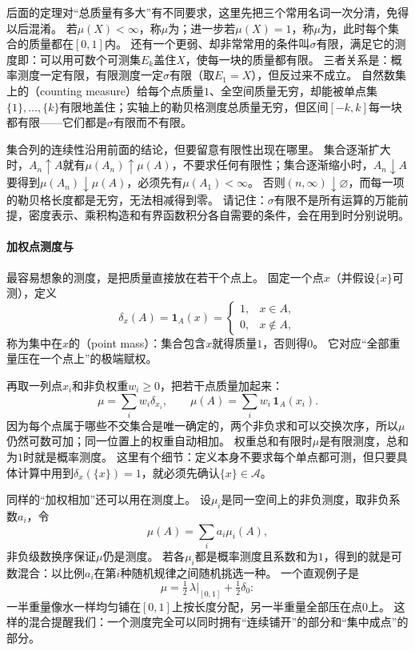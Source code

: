 后面的定理对“总质量有多大”有不同要求，这里先把三个常用名词一次分清，免得以后混淆。
若$\mu(X)<\infty$，称$\mu$为；进一步若$\mu(X)=1$，称$\mu$为，此时每个集合的质量都在$[0,1]$内。
还有一个更弱、却非常常用的条件叫$\sigma$有限，满足它的测度即：可以用可数个可测集$E_k$盖住$X$，使每一块的质量都有限。
三者关系是：概率测度一定有限，有限测度一定$\sigma$有限（取$E_1=X$），但反过来不成立。
自然数集上的（counting measure）给每个点质量$1$、全空间质量无穷，却能被单点集$\{1\},\ldots,\{k\}$有限地盖住；实轴上的勒贝格测度总质量无穷，但区间$[-k,k]$每一块都有限——它们都是$\sigma$有限而不有限。

集合列的连续性沿用前面的结论，但要留意有限性出现在哪里。
集合逐渐扩大时，$A_n\uparrow A$就有$\mu(A_n)\uparrow\mu(A)$，不要求任何有限性；集合逐渐缩小时，$A_n\downarrow A$要得到$\mu(A_n)\downarrow\mu(A)$，必须先有$\mu(A_1)<\infty$。
否则$(n,\infty)\downarrow\varnothing$，而每一项的勒贝格长度都是无穷，无法相减得到零。
请记住：$\sigma$有限不是所有运算的万能前提，密度表示、乘积构造和有界函数积分各自需要的条件，会在用到时分别说明。

\paragraph{加权点测度与}

最容易想象的测度，是把质量直接放在若干个点上。
固定一个点$x$（并假设$\{x\}$可测），定义
\[
 \delta_x(A)=\mathbf 1_A(x)=
 \begin{cases}1,&x\in A,\\0,&x\notin A,\end{cases}
\]
称为集中在$x$的（point mass）：集合包含$x$就得质量$1$，否则得$0$。
它对应“全部重量压在一个点上”的极端赋权。

再取一列点$x_i$和非负权重$w_i\geq0$，把若干点质量加起来：
\[
 \mu=\sum_i w_i\delta_{x_i},\qquad
 \mu(A)=\sum_i w_i\,\mathbf 1_A(x_i).
\]
因为每个点属于哪些不交集合是唯一确定的，两个非负求和可以交换次序，所以$\mu$仍然可数可加；同一位置上的权重自动相加。
权重总和有限时$\mu$是有限测度，总和为$1$时就是概率测度。
这里有个细节：定义本身不要求每个单点都可测，但只要具体计算中用到$\delta_x(\{x\})=1$，就必须先确认$\{x\}\in\mathcal A$。

同样的“加权相加”还可以用在测度上。
设$\mu_i$是同一空间上的非负测度，取非负系数$a_i$，令
\[
 \mu(A)=\sum_i a_i\mu_i(A),
\]
非负级数换序保证$\mu$仍是测度。
若各$\mu_i$都是概率测度且系数和为$1$，得到的就是可数混合：以比例$a_i$在第$i$种随机规律之间随机挑选一种。
一个直观例子是
\[
 \mu=\tfrac12\,\lambda|_{[0,1]}+\tfrac12\delta_0:
\]
一半重量像水一样均匀铺在$[0,1]$上按长度分配，另一半重量全部压在点$0$上。
这样的混合提醒我们：一个测度完全可以同时拥有“连续铺开”的部分和“集中成点”的部分。

